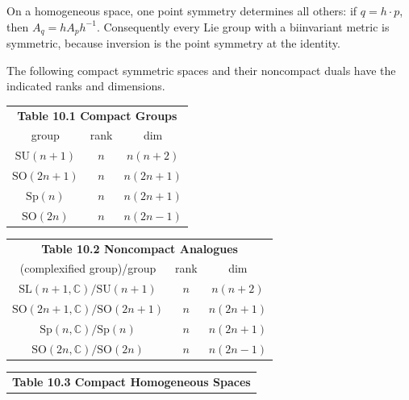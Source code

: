 \begin{remark}
  \label{rem:pet-ch10-single-point-symmetry}

  On a homogeneous space, one point symmetry determines all others: if
  $q=h\cdot p$, then $A_q=hA_ph^{-1}$. Consequently every Lie group with a
  biinvariant metric is symmetric, because inversion is the point symmetry at
  the identity.
\end{remark}

\begin{definition}
  \label{def:pet-ch10-symmetric-space-tables}

  The following compact symmetric spaces and their noncompact duals have the
  indicated ranks and dimensions.
  \begin{center}
    \begin{tabular}{c|c|c}
      \multicolumn{3}{c}{\textbf{Table 10.1 Compact Groups}}\\
      group & rank & dim\\\hline
      $\mathrm{SU}(n+1)$ & $n$ & $n(n+2)$\\
      $\mathrm{SO}(2n+1)$ & $n$ & $n(2n+1)$\\
      $\mathrm{Sp}(n)$ & $n$ & $n(2n+1)$\\
      $\mathrm{SO}(2n)$ & $n$ & $n(2n-1)$
    \end{tabular}
    \qquad
    \begin{tabular}{c|c|c}
      \multicolumn{3}{c}{\textbf{Table 10.2 Noncompact Analogues}}\\
      (complexified group)/group & rank & dim\\\hline
      $\mathrm{SL}(n{+}1,\mathbb C)/\mathrm{SU}(n{+}1)$ & $n$ & $n(n+2)$\\
      $\mathrm{SO}(2n{+}1,\mathbb C)/\mathrm{SO}(2n{+}1)$ & $n$ & $n(2n+1)$\\
      $\mathrm{Sp}(n,\mathbb C)/\mathrm{Sp}(n)$ & $n$ & $n(2n+1)$\\
      $\mathrm{SO}(2n,\mathbb C)/\mathrm{SO}(2n)$ & $n$ & $n(2n-1)$
    \end{tabular}
  \end{center}
  \begin{center}
    \begin{tabular}{l|l|c|c|l}
      \multicolumn{5}{c}{\textbf{Table 10.3 Compact Homogeneous Spaces}}\\

\end{tabular}
\end{center}
\end{definition}
